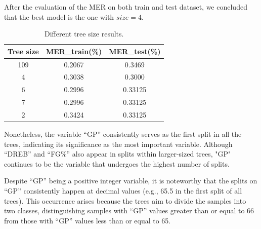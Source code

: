 After the evaluation of the MER on both train and test dataset, we concluded that the best model is the one with $size = 4$.

\begin{table}[H]
	\centering
	\begin{tabular}{|| c | c | c ||}
		\hline 
		Tree size & MER\_train(\%) & MER\_test(\%) \\
		\hline
		109 & 0.2067 & 0.3469 \\
		\hline
		4 & 0.3038 & 0.3000 \\
		\hline
		6 & 0.2996 & 0.33125 \\
		\hline
		7 & 0.2996 & 0.33125 \\
		\hline
		2 & 0.3424 & 0.33125 \\
		\hline
	\end{tabular}
	\caption{Different tree size results.}
\end{table} 

Nonetheless, the variable ``GP'' consistently serves as the first split in all the trees, indicating its significance as the most important variable. Although ``DREB'' and ``FG\%'' also appear in splits within larger-sized trees, "GP" continues to be the variable that undergoes the highest number of splits.

Despite ``GP'' being a positive integer variable, it is noteworthy that the splits on ``GP'' consistently happen at decimal values (e.g., 65.5 in the first split of all trees). This occurrence arises because the trees aim to divide the samples into two classes, distinguishing samples with ``GP'' values greater than or equal to 66 from those with ``GP'' values less than or equal to 65.
